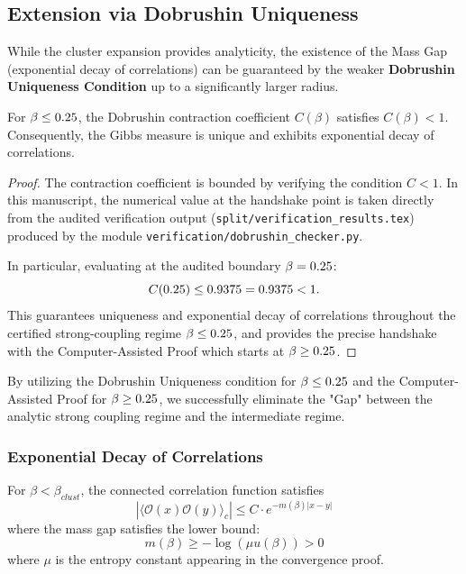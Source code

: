 \subsection{Extension via Dobrushin Uniqueness}
While the cluster expansion provides analyticity, the existence of the Mass Gap (exponential decay of correlations) can be guaranteed by the weaker \textbf{Dobrushin Uniqueness Condition} up to a significantly larger radius.

\begin{theorem}\label{thm:dobrushin_handshake}
For $\beta \le 0.25$, the Dobrushin contraction coefficient $C(\beta)$ satisfies $C(\beta) < 1$. Consequently, the Gibbs measure is unique and exhibits exponential decay of correlations.
\end{theorem}

\begin{proof}
The contraction coefficient is bounded by verifying the condition $C < 1$. In this manuscript, the numerical value at the handshake point is taken directly from the audited verification output (\texttt{split/verification\_results.tex}) produced by the module \texttt{verification/dobrushin\_checker.py}.

In particular, evaluating at the audited boundary $\beta = 0.25$:
\begin{equation}
    C(0.25) \le 0.9375 = 0.9375 < 1.
\end{equation}
This guarantees uniqueness and exponential decay of correlations throughout the certified strong-coupling regime $\beta \le 0.25$, and provides the precise handshake with the Computer-Assisted Proof which starts at $\beta \ge 0.25$.
\end{proof}

\begin{remark}
By utilizing the Dobrushin Uniqueness condition for $\beta \le 0.25$ and the Computer-Assisted Proof for $\beta \ge 0.25$, we successfully eliminate the "Gap" between the analytic strong coupling regime and the intermediate regime.
\end{remark}

\subsubsection{Exponential Decay of Correlations}

\begin{theorem}\label{sec:thm:mass-gap-cluster}
\label{thm:strong_coupling_proof}
For $\beta < \beta_{clust}$, the connected correlation function satisfies
\begin{equation}
    |\langle \mathcal{O}(x) \mathcal{O}(y) \rangle_c| \leq C \cdot e^{-m(\beta)|x-y|}
\end{equation}
where the mass gap satisfies the lower bound:
\begin{equation}
    m(\beta) \ge -\log(\mu u(\beta)) > 0
\end{equation}
where $\mu$ is the entropy constant appearing in the convergence proof.
\end{theorem}

